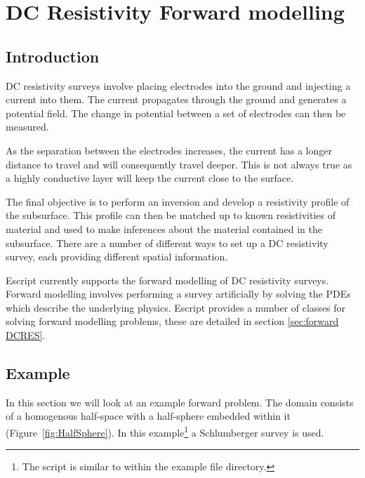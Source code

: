%
%
%

\chapter{DC Resistivity Forward modelling}\label{Chp:cook:Dc Resistivity inversion}
\section{Introduction}
DC resistivity surveys involve placing electrodes into the ground and injecting a current
into them. The current propagates through the ground and generates a potential field.
The change in potential between a set of electrodes can then be measured.

As the separation between the electrodes increases, the current has a longer 
distance to travel and will consequently travel deeper. This is not always true
as a highly conductive layer will keep the current close to the surface.

The final objective is to perform an inversion and develop a resistivity profile of the subsurface.
This profile can then be matched up to known resistivities of material and used 
to make inferences about the material contained in the subsurface.
There are
a number of different ways to set up a DC resistivity survey, each providing
different spatial information\cite[pg 5]{LOKE2014}.

Escript currently supports the forward modelling of DC resistivity surveys. Forward modelling
involves performing a survey artificially by solving the PDEs which describe the underlying
physics. Escript provides a number of classes for solving forward modelling problems, these are
detailed in section \ref{sec:forward DCRES}.

\section{Example}
In this section we will look at an example forward problem. The domain consists of
a homogenous half-space with a half-sphere embedded within it (Figure~\ref{fig:HalfSphere}). 
In this example\footnote{The script is similar to
 within the \escript example file directory.}
 a Schlumberger survey is used.



